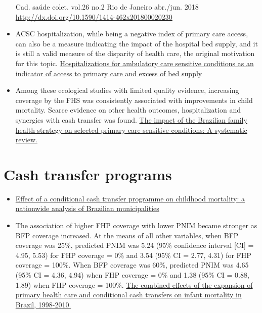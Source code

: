 \documentclass[]{book}
\begin{document}
\begin{itemize}
  Cad. saúde colet. vol.26 no.2 Rio de Janeiro abr./jun. 2018 \url{http://dx.doi.org/10.1590/1414-462x201800020230}
\item
  ACSC hospitalization, while being a negative index of primary care access, can also be a measure indicating the impact of the hospital bed supply, and it is still a valid measure of the disparity of health care, the original motivation for this topic. \href{https://bmchealthservres.biomedcentral.com/articles/10.1186/s12913-019-4098-x}{Hospitalizations for ambulatory care sensitive conditions as an indicator of access to primary care and excess of bed supply}
\item
  Among these ecological studies with limited quality evidence, increasing coverage by the FHS was consistently associated with improvements in child mortality. Scarce evidence on other health outcomes, hospitalization and synergies with cash transfer was found. \href{https://journals.plos.org/plosone/article?id=10.1371/journal.pone.0182336}{The impact of the Brazilian family health strategy on selected primary care sensitive conditions: A systematic review.}
\end{itemize}

\hypertarget{cash-transfer-programs}{%
\section*{Cash transfer programs}\label{cash-transfer-programs}}

\begin{itemize}
\item
  \href{https://sci-hub.tw/https://doi.org/10.1016/S0140-6736(13)60715-1}{Effect of a conditional cash transfer programme on childhood mortality: a nationwide analysis of Brazilian municipalities}
\item
  The association of higher FHP coverage with lower PNIM became stronger as BFP coverage increased. At the means of all other variables, when BFP coverage was 25\%, predicted PNIM was 5.24 (95\% confidence interval {[}CI{]} = 4.95, 5.53) for FHP coverage = 0\% and 3.54 (95\% CI = 2.77, 4.31) for FHP coverage = 100\%. When BFP coverage was 60\%, predicted PNIM was 4.65 (95\% CI = 4.36, 4.94) when FHP coverage = 0\% and 1.38 (95\% CI = 0.88, 1.89) when FHP coverage = 100\%. \href{https://www.ncbi.nlm.nih.gov/pmc/articles/PMC3828713/pdf/AJPH.2013.301452.pdf}{The combined effects of the expansion of primary health care and conditional cash transfers on infant mortality in Brazil, 1998-2010.}
\end{itemize}


\end{document}
